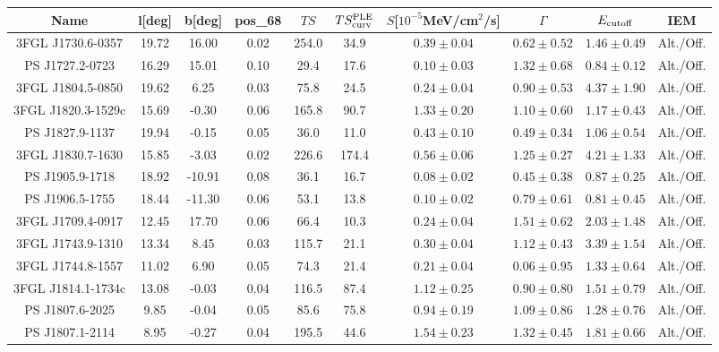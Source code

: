 \begin{table*}
\center
\begin{tabular}{|c|c|c|c|c|c|c|c|c|c|}
\hline
Name & l[deg]& b[deg] & pos\_68 & $TS$  & $TS^{\rm{PLE}}_{\rm{curv}}$  & $S$[$10^{-5}$MeV/cm$^2$/s] & $\Gamma$ & $E_{\rm{cutoff}}$ & IEM\\
\hline
\hline
 3FGL J1730.6-0357 & 19.72 & 16.00 & 0.02 & 254.0 & 34.9 & $0.39\pm0.04$ & $0.62\pm0.52$ & $1.46\pm0.49$ & Alt./Off.\\
\hline 
 PS J1727.2-0723 & 16.29 & 15.01 & 0.10 & 29.4 & 17.6 & $0.10\pm0.03$ & $1.32\pm0.68$ & $0.84\pm0.12$ & Alt./Off.\\
\hline 
 3FGL J1804.5-0850 & 19.62 & 6.25 & 0.03 & 75.8 & 24.5 & $0.24\pm0.04$ & $0.90\pm0.53$ & $4.37\pm1.90$ & Alt./Off.\\
\hline 
 3FGL J1820.3-1529c & 15.69 & -0.30 & 0.06 & 165.8 & 90.7 & $1.33\pm0.20$ & $1.10\pm0.60$ & $1.17\pm0.43$ & Alt./Off.\\
\hline 
 PS J1827.9-1137 & 19.94 & -0.15 & 0.05 & 36.0 & 11.0 & $0.43\pm0.10$ & $0.49\pm0.34$ & $1.06\pm0.54$ & Alt./Off.\\
\hline 
 3FGL J1830.7-1630 & 15.85 & -3.03 & 0.02 & 226.6 & 174.4 & $0.56\pm0.06$ & $1.25\pm0.27$ & $4.21\pm1.33$ & Alt./Off.\\
\hline 
 PS J1905.9-1718 & 18.92 & -10.91 & 0.08 & 36.1 & 16.7 & $0.08\pm0.02$ & $0.45\pm0.38$ & $0.87\pm0.25$ & Alt./Off.\\
\hline 
 PS J1906.5-1755 & 18.44 & -11.30 & 0.06 & 53.1 & 13.8 & $0.10\pm0.02$ & $0.79\pm0.61$ & $0.81\pm0.45$ & Alt./Off.\\
\hline 
 3FGL J1709.4-0917 & 12.45 & 17.70 & 0.06 & 66.4 & 10.3 & $0.24\pm0.04$ & $1.51\pm0.62$ & $2.03\pm1.48$ & Alt./Off.\\
\hline 
 3FGL J1743.9-1310 & 13.34 & 8.45 & 0.03 & 115.7 & 21.1 & $0.30\pm0.04$ & $1.12\pm0.43$ & $3.39\pm1.54$ & Alt./Off.\\
\hline 
 3FGL J1744.8-1557 & 11.02 & 6.90 & 0.05 & 74.3 & 21.4 & $0.21\pm0.04$ & $0.06\pm0.95$ & $1.33\pm0.64$ & Alt./Off.\\
\hline 
 3FGL J1814.1-1734c & 13.08 & -0.03 & 0.04 & 116.5 & 87.4 & $1.12\pm0.25$ & $0.90\pm0.80$ & $1.51\pm0.79$ & Alt./Off.\\
\hline 
 PS J1807.6-2025 & 9.85 & -0.04 & 0.05 & 85.6 & 75.8 & $0.94\pm0.19$ & $1.09\pm0.86$ & $1.28\pm0.76$ & Alt./Off.\\
\hline 
 PS J1807.1-2114 & 8.95 & -0.27 & 0.04 & 195.5 & 44.6 & $1.54\pm0.23$ & $1.32\pm0.45$ & $1.81\pm0.66$ & Alt./Off.\\

\end{tabular}
\end{table*}
